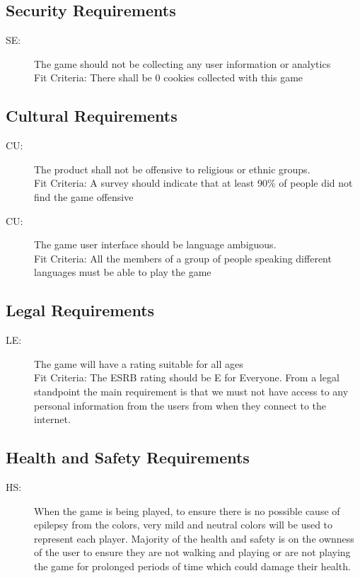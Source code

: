 \documentclass[12pt, titlepage]{article}
\newcounter{secreq}
\newcommand{\sethesecreq}{SE\thesecreq}
\newcounter{culreq}
\newcommand{\cultheculreq}{CU\theculreq}
\newcounter{legreq}
\newcommand{\legthelegreq}{LE\thelegreq}
\newcounter{hsreq}
\newcommand{\hsthehsreq}{HS\thehsreq}
\begin{document}
\subsection{Security Requirements}
\begin{description}
\item [ \sethesecreq:] The game should not be collecting any user information or analytics\\ Fit Criteria: There shall be 0 cookies collected with this game
\end{description}

\subsection{Cultural Requirements}
\begin{description}
\item [ \cultheculreq:] The product shall not be offensive to religious or ethnic groups. \\
Fit Criteria: A survey should indicate that at least 90\% of people did not find the game offensive
\item [ \cultheculreq:] The game user interface should be language ambiguous.\\
Fit Criteria: All the members of a group of people speaking different languages must be able to play the game
\end{description}

\subsection{Legal Requirements}
\begin{description}
\item [ \legthelegreq:] The game will have a rating suitable for all ages\\
Fit Criteria: The ESRB rating should be E for Everyone.
From a legal standpoint the main requirement is that we must not have access to
any personal information from the users from when they connect to the internet.
\end{description}

\subsection{Health and Safety Requirements}
\begin{description}
\item [ \hsthehsreq:]
When the game is being played, to ensure there is no possible cause of epilepsy
from the colors, very mild and neutral colors will be used to represent each
player. Majority of the health and safety is on the ownness of the user to
ensure they are not walking and playing or are not playing the game for
prolonged periods of time which could damage their health.
\end{description}
\end{document}
